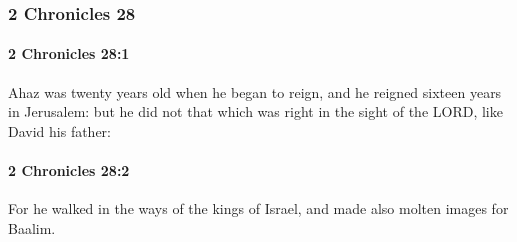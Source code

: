 	\subsubsection{2 Chronicles 28} %
		\label{2CHRONICLES-28}

		\paragraph{2 Chronicles 28:1} %
			\label{2CHRONICLES-28-1}

			Ahaz was twenty years old when he began to reign, and he reigned sixteen years in Jerusalem: but he did not that which was right in the sight of the LORD, like David his father:


		\paragraph{2 Chronicles 28:2} %
			\label{2CHRONICLES-28-2}

			For he walked in the ways of the kings of Israel, and made also molten images for Baalim.

